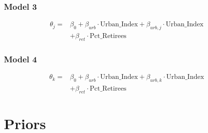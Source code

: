 \documentclass[12pt]{article}
\begin{document}



\subsubsection*{Model 3}




\begin{equation} \label{eq:mod3_centered}
	\begin{aligned}
		\theta_{j} =    &\beta_0 + \beta_{urb} \cdot \text{Urban\_Index} + \beta_{urb,j} \cdot \text{Urban\_Index} \\
		&+ \beta_{ret} \cdot \text{Pct\_Retirees}
	\end{aligned}
\end{equation}





\subsubsection*{Model 4}




\begin{equation} \label{eq:mod4_centered}
	\begin{aligned}
		\theta_{k} =    &\beta_0 + \beta_{urb} \cdot \text{Urban\_Index} + \beta_{urb,k} \cdot \text{Urban\_Index} \\
		&+ \beta_{ret} \cdot \text{Pct\_Retirees}
	\end{aligned}
\end{equation}





\section{Priors}
\end{document}
